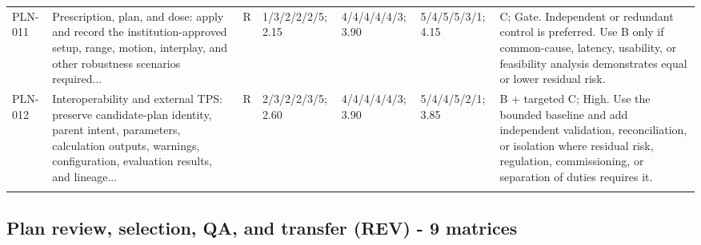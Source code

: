 \documentclass[11pt,letterpaper]{article}
\begin{document}
\begin{scriptsize}
\begin{longtable}{@{}L{0.11\textwidth}L{0.165\textwidth}L{0.04\textwidth}L{0.115\textwidth}L{0.115\textwidth}L{0.115\textwidth}L{0.235\textwidth}@{}}
\addlinespace[2pt]
PLN-011 & Prescription, plan, and dose: apply and record the institution-approved setup, range, motion, interplay, and other robustness scenarios required... & R & 1/3/2/2/2/5; 2.15 & 4/4/4/4/4/3; 3.90 & 5/4/5/5/3/1; 4.15 & C; Gate. Independent or redundant control is preferred. Use B only if common-cause, latency, usability, or feasibility analysis demonstrates equal or lower residual risk. \\
\addlinespace[2pt]
PLN-012 & Interoperability and external TPS: preserve candidate-plan identity, parent intent, parameters, calculation outputs, warnings, configuration, evaluation results, and lineage... & R & 2/3/2/2/3/5; 2.60 & 4/4/4/4/4/3; 3.90 & 5/4/4/5/2/1; 3.85 & B + targeted C; High. Use the bounded baseline and add independent validation, reconciliation, or isolation where residual risk, regulation, commissioning, or separation of duties requires it. \\
\addlinespace[2pt]
\end{longtable}
\end{scriptsize}

\subsection{Plan review, selection, QA, and transfer (REV) - 9 matrices}
\end{document}
